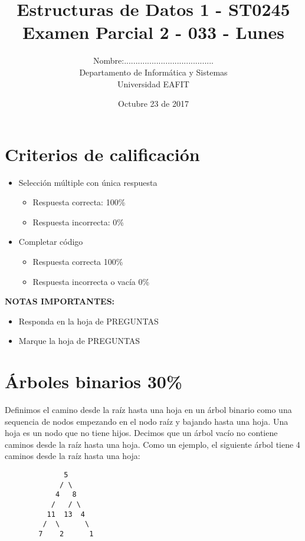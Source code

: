 \documentclass[twocolumn]{article}
\author{
Nombre:....................................... \\
    Departamento de Informática y Sistemas \\
    Universidad EAFIT \\
}
\title{
    Estructuras de Datos 1 - ST0245 \\
    Examen Parcial 2 - 033 - Lunes
}
\date{
    Octubre 23 de 2017
}
\begin{document}
\vspace{-5cm}
\maketitle


\section*{Criterios de calificación}

{\small
\begin{itemize}
\item Selección múltiple con única respuesta
\begin{itemize}
\item Respuesta correcta: 100\%
\item Respuesta incorrecta: 0\%
\end{itemize}

\item Completar código
\begin{itemize}
\item Respuesta correcta 100\%
\item Respuesta incorrecta o vacía 0\%\\
\end{itemize}
\end{itemize}


\textbf{NOTAS IMPORTANTES:}
\begin{itemize}
	\item Responda en la hoja de PREGUNTAS
	\item Marque la hoja de PREGUNTAS
\end{itemize}
}


\section{Árboles binarios 30\%}
Definimos el camino desde la raíz hasta una hoja en un árbol binario como una sequencia de nodos empezando
en el nodo raíz y bajando hasta una hoja. Una hoja es un nodo que no tiene hijos. Decimos que un árbol vacío no contiene
caminos desde la raíz hasta una hoja. Como un ejemplo, el siguiente árbol tiene 4 caminos desde la raíz hasta una hoja:
{\small
\begin{verbatim}
              5
             / \
            4   8
           /   / \
          11  13  4
         /  \      \
        7    2      1
\end{verbatim}
}
\end{document}
